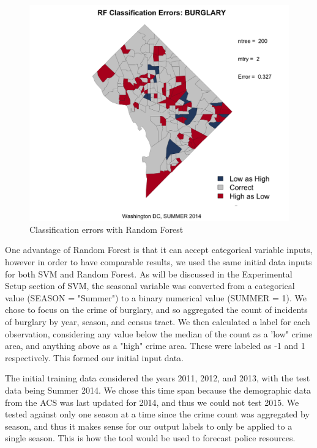 \documentclass [a4paper,12 pt]{article}
\begin{document}
%
\begin{figure}
\begin{center}
\vspace{-20pt}
\includegraphics[viewport=200 0 1200 1000,clip,scale=0.30]{Figures/RF_errors_BURGLARY_SUMMER2014_ntree200_mtry2.png}
\caption{Classification errors with Random Forest}\label{predClassRFmap}				
\end{center}
\end{figure}

One advantage of Random Forest is that it can accept categorical variable inputs, however in order to have comparable results, we used the same initial data inputs for both SVM and Random Forest. As will be discussed in the Experimental Setup section of SVM, the seasonal variable was converted from a categorical value (SEASON = "Summer") to a binary numerical value (SUMMER = 1). We chose to focus on the crime of burglary, and so aggregated the count of incidents of burglary by year, season, and census tract. We then calculated a label for each observation, considering any value below the median of the count as a 'low" crime area, and anything above as a "high" crime area. These were labeled as -1 and 1 respectively. This formed our initial input data. 

The initial training data considered the years 2011, 2012, and 2013, with the test data being Summer 2014. We chose this time span because the demographic data from the ACS was last updated for 2014, and thus we could not test 2015. We tested against only one season at a time since the crime count was aggregated by season, and thus it makes sense for our output labels to only be applied to a single season. This is how the tool would be used to forecast police resources.
\end{document}
